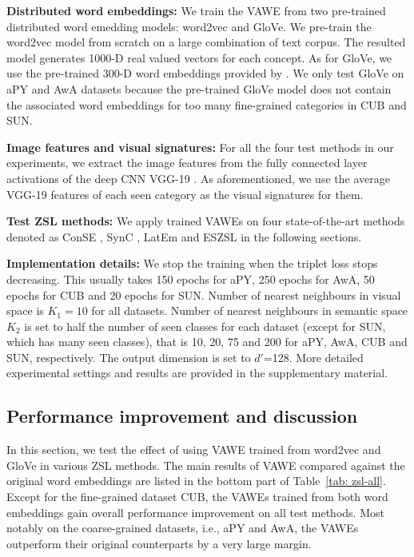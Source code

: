 \documentclass{bmvc2k}
\begin{document}
{\bf Distributed word embeddings:} We train the VAWE from two pre-trained distributed word emedding models: word2vec and GloVe. We pre-train the word2vec model from scratch on a large combination of text corpus.
%
The resulted model generates 1000-D real valued vectors for each concept.  As for GloVe, we use the pre-trained 300-D word embeddings provided by \cite{glove}.
  We only test GloVe on aPY and AwA datasets because the pre-trained GloVe model does not contain the associated word embeddings for too many fine-grained categories in CUB and SUN. %

{\bf Image features and visual signatures:} For all the four test methods in our experiments, we extract the image features from the fully connected layer activations of the deep CNN VGG-19 \cite{Simonyan14VGG}. As aforementioned, we use the average VGG-19 features of each seen category as the visual signatures for them.

{\bf Test ZSL methods:} We apply trained VAWEs on four state-of-the-art methods denoted as ConSE \cite{NorouziConse13}, SynC \cite{SynC2016}, LatEm \cite{LatEm2016} and ESZSL \cite{Romera2015ZSL} in the following sections.%


{\bf Implementation details:} We stop the training when the triplet loss stops decreasing. This usually takes 150 epochs for aPY, 250 epochs for AwA, 50 epochs for CUB and 20 epochs for SUN. Number of nearest neighbours in visual space is $K_1=10$ for all datasets. Number of nearest neighbours in semantic space $K_2$ is set to half the number of seen classes for each dataset (except for SUN, which has many seen classes), that is 10, 20, 75 and 200 for aPY, AwA, CUB and SUN,  respectively. The output dimension is set to $d'$=128. More detailed experimental settings and results are provided in the supplementary material.  %





\subsection{Performance improvement and discussion}
In this section, we test the effect of using VAWE trained from word2vec and GloVe in various ZSL methods. The main results of VAWE compared against the original word embeddings are listed in the bottom part of Table~\ref{tab: zsl-all}. Except for the fine-grained dataset CUB, the VAWEs trained from both word embeddings gain overall performance improvement on all test methods. Most notably on the coarse-grained datasets, i.e., aPY and AwA, the VAWEs outperform their original counterparts by a very large margin.
\end{document}
